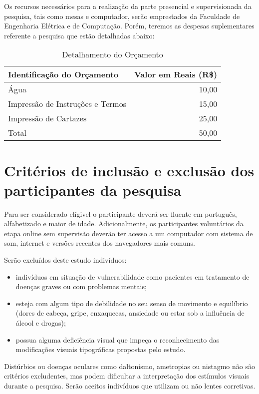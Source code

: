 \documentclass[a4paper,11pt,titlepage,singlespacing]{article}
\begin{document}
Os recursos necessários para a realização da parte presencial e supervisionada da pesquisa, tais como mesas e computador, serão emprestados da Faculdade de Engenharia Elétrica e de Computação. Porém, teremos as despesas suplementares referente a pesquisa que estão detalhadas abaixo:

\begin{table}[h]
\caption{Detalhamento do Orçamento}
\centering
\vspace{0.5cm}
\begin{tabular}{l|r}
Identificação do Orçamento & Valor em Reais (R\$) \\
\hline 
Água        & 10,00 \\
Impressão de Instruções e Termos  & 15,00 \\
Impressão de Cartazes  & 25,00 \\
\hline 
Total & 50,00
\end{tabular}
\end{table}

\section{Critérios de inclusão e exclusão dos participantes da pesquisa}

\noindent Para ser considerado elígivel o participante deverá ser fluente em português, alfabetizado e maior de idade. Adicionalmente, os participantes voluntários da etapa online sem supervisão deverão ter acesso a um computador com sistema de som, internet e versões recentes dos navegadores mais comuns.

Serão excluídos deste estudo indivíduos:

\begin{itemize}
\item indivíduos em situação de vulnerabilidade como pacientes em tratamento de doenças graves ou com problemas mentais;
\item esteja com algum tipo de debilidade no seu senso de movimento e equilíbrio (dores de cabeça, gripe, enxaquecas, ansiedade ou estar sob a influência de álcool e drogas);
\item possua alguma deficiência visual que impeça o reconhecimento das modificações visuais tipográficas propostas pelo estudo.
\end{itemize}

Distúrbios ou doenças oculares como daltonismo, ametropias ou nistagmo não são critérios excludentes, mas podem dificultar a interpretação dos estímulos visuais durante a pesquisa. Serão aceitos indivíduos que utilizam ou não lentes corretivas. 
\end{document}
